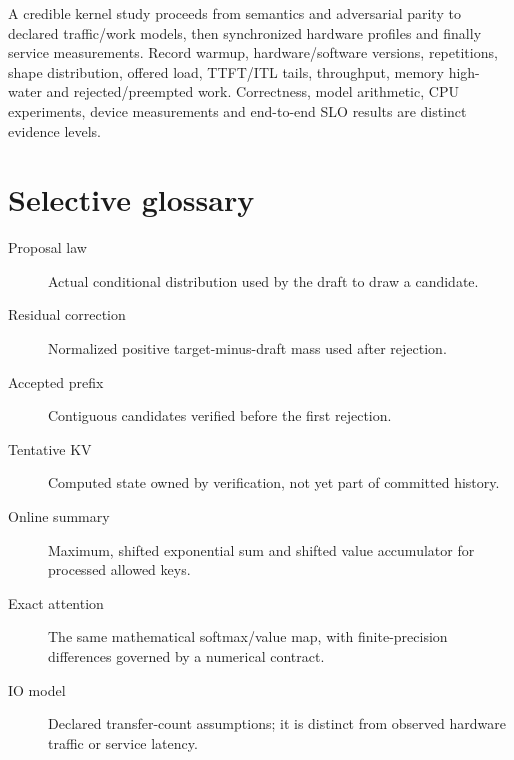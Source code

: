 A credible kernel study proceeds from semantics and adversarial parity to
declared traffic/work models, then synchronized hardware profiles and
finally service measurements. Record warmup, hardware/software versions,
repetitions, shape distribution, offered load, TTFT/ITL tails, throughput,
memory high-water and rejected/preempted work. Correctness, model arithmetic,
CPU experiments, device measurements and end-to-end SLO results are distinct
evidence levels.

\section{Selective glossary}
\begin{description}
\item[Proposal law] Actual conditional distribution used by the draft to draw a candidate.
\item[Residual correction] Normalized positive target-minus-draft mass used after rejection.
\item[Accepted prefix] Contiguous candidates verified before the first rejection.
\item[Tentative KV] Computed state owned by verification, not yet part of committed history.
\item[Online summary] Maximum, shifted exponential sum and shifted value accumulator for processed allowed keys.
\item[Exact attention] The same mathematical softmax/value map, with finite-precision differences governed by a numerical contract.
\item[IO model] Declared transfer-count assumptions; it is distinct from observed hardware traffic or service latency.
\end{description}


